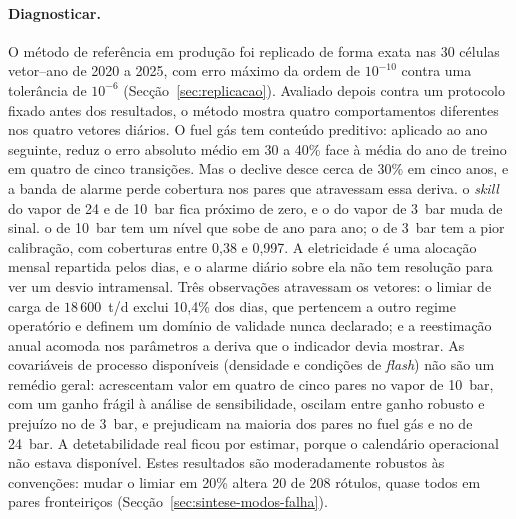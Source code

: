 \paragraph{Diagnosticar.} O método de referência em produção foi replicado
de forma exata nas 30 células vetor--ano de 2020 a 2025, com erro máximo da
ordem de $10^{-10}$ contra uma tolerância de $10^{-6}$
(Secção~\ref{sec:replicacao}). Avaliado depois contra um protocolo fixado
antes dos resultados, o método mostra quatro comportamentos diferentes nos
quatro vetores diários. O fuel gás tem conteúdo preditivo: aplicado ao ano
seguinte, reduz o erro absoluto médio em 30 a 40\% face à média do ano de
treino em quatro de cinco transições. Mas o declive desce cerca de 30\% em
cinco anos, e a banda de alarme perde cobertura nos pares que atravessam
essa deriva.  o \emph{skill} do vapor de 24 e de
10~bar fica próximo de zero, e o do vapor de 3~bar muda de sinal.  o de 10~bar tem um nível que sobe de ano para ano; o
de 3~bar tem a pior calibração, com coberturas entre 0,38 e 0,997. A
eletricidade é uma alocação mensal repartida pelos dias, e o alarme diário
sobre ela não tem resolução para ver um desvio intramensal. Três observações
atravessam os vetores: o limiar de carga de $18\,600$~t/d exclui 10,4\% dos
dias, que pertencem a outro regime operatório e definem um domínio de
validade nunca declarado;  e a reestimação anual acomoda nos parâmetros a deriva que o
indicador devia mostrar. As covariáveis de processo disponíveis (densidade e condições de
\emph{flash}) não são um remédio geral: acrescentam valor em quatro de cinco
pares no vapor de 10~bar, com um ganho frágil à análise de sensibilidade,
oscilam entre ganho robusto e prejuízo no de 3~bar, e prejudicam na maioria
dos pares no fuel gás e no de 24~bar. A detetabilidade real ficou por estimar, porque o
calendário operacional não estava disponível. Estes resultados são
moderadamente robustos às convenções: mudar o limiar em 20\% altera 20 de
208 rótulos, quase todos em pares fronteiriços
(Secção~\ref{sec:sintese-modos-falha}).

